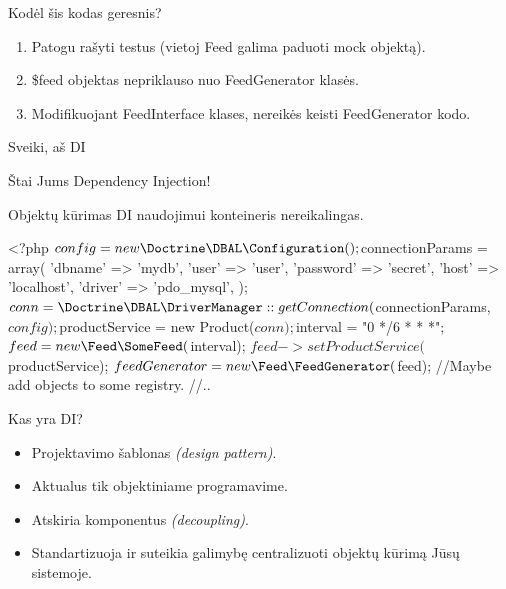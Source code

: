\documentclass[12pt,a4paper]{beamer}
\begin{document}
\begin{frame}[fragile]{Kodėl šis kodas geresnis?}
\begin{enumerate}
    \item Patogu rašyti testus (vietoj Feed galima paduoti mock objektą).
    \item \$feed objektas nepriklauso nuo FeedGenerator klasės.
    \item Modifikuojant FeedInterface klases, nereikės keisti FeedGenerator kodo.
\end{enumerate}
\end{frame}

\begin{frame}[fragile]{Sveiki, aš DI}
    \begin{center}
        {\Huge Štai Jums Dependency Injection!}
    \end{center}
\end{frame}

\begin{frame}[fragile]{Objektų kūrimas}
    DI naudojimui konteineris nereikalingas.
    \vskip0.5cm
\begin{phpcode}
    <?php
    $config = new \Doctrine\DBAL\Configuration();
    $connectionParams = array(
        'dbname' => 'mydb',
        'user' => 'user',
        'password' => 'secret',
        'host' => 'localhost',
        'driver' => 'pdo_mysql',
    );
    $conn = \Doctrine\DBAL\DriverManager::getConnection(
        $connectionParams, $config);
    $productService = new Product($conn);
    $interval = "0 */6 * * *";
    $feed = new \Feed\SomeFeed($interval);
    $feed->setProductService($productService);
    $feedGenerator = new \Feed\FeedGenerator($feed);
    //Maybe add objects to some registry.
    //..

\end{phpcode}
\end{frame}

\begin{frame}{Kas yra DI?}

    \begin{itemize}
        \item Projektavimo šablonas \emph{(design pattern)}.
        \item Aktualus tik objektiniame programavime.
        \item Atskiria komponentus \emph{(decoupling)}.
        \item Standartizuoja ir suteikia galimybę centralizuoti objektų kūrimą Jūsų sistemoje.
    \end{itemize}
\end{frame}
\end{document}

